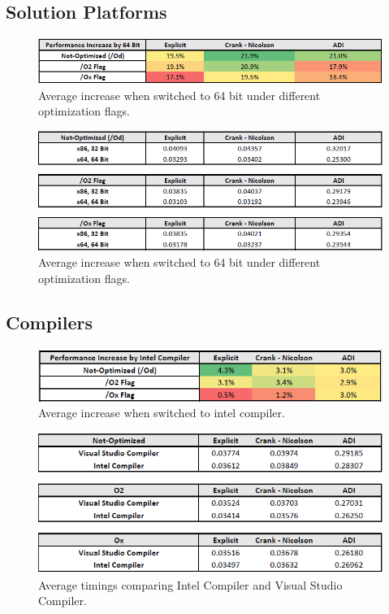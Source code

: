 \documentclass[12pt, oneside]{book}
\theoremstyle{plain}
\theoremstyle{definition}
\begin{document}
\subsection{Solution Platforms} 
\begin{figure}[!htb]
    \centering
        \includegraphics[scale=0.8]{bitPercent.png}
    \caption{Average increase when switched to 64 bit under different optimization flags.}
\end{figure}

\begin{figure}[!htb]
    \centering
        \includegraphics[scale=0.8]{bit.png}
    \caption{Average increase when switched to 64 bit under different optimization flags.}
\end{figure}

\subsection{Compilers} 
\begin{figure}[!htb]
    \centering
        \includegraphics[scale=0.8]{compilerPercent.png}
    \caption{Average increase when switched to intel compiler.}
\end{figure}

\begin{figure}[!htb]
    \centering
        \includegraphics[scale=0.8]{compilerT.png}
    \caption{Average timings comparing Intel Compiler and Visual Studio Compiler.}
\end{figure}
\end{document}
